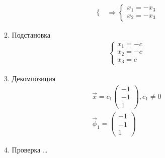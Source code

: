 \documentclass{article}
\begin{document}
\begin{enumerate}
\begin{enumerate}
\begin{gather*}
\begin{cases}
			\end{cases} \Rightarrow \begin{cases}
				x_1 = -x_3 \\
				x_2 = -x_3
			\end{cases}
		\end{gather*}
		\item Подстановка
		\begin{gather*}
			\begin{cases}
				x_1 = -c \\
				x_2 = -c \\
				x_3 = c
			\end{cases}
		\end{gather*}
		\item Декомпозиция
		\begin{gather*}
			\vec{x} = c_1 \begin{pmatrix}
				-1 \\ -1 \\ 1
			\end{pmatrix}, c_1 \ne 0 \\
			\vec{\phi}_1 = \begin{pmatrix}
				-1 \\ -1 \\ 1
			\end{pmatrix}
		\end{gather*}
		\item Проверка \dots
	\end{enumerate}
\end{enumerate}
\end{document}
